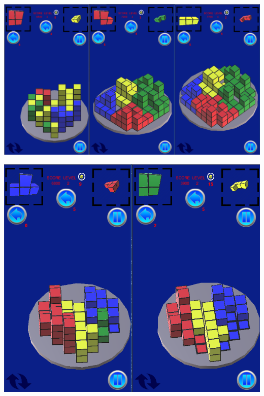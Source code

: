 \documentclass[9pt, b5paper]{article}
\begin{document}
\includegraphics[width=.9\linewidth]{./pic/readme_20221110_112552.png}

\includegraphics[width=.9\linewidth]{./pic/readme_20221109_180107.png}
\end{document}
